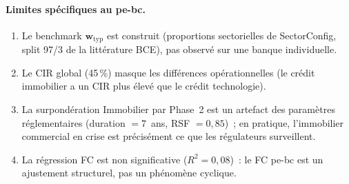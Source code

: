 \documentclass[10pt, a4paper, oneside]{report}
\theoremstyle{definition}
\begin{document}
\paragraph{Limites spécifiques au pe-bc.}
\begin{enumerate}[nosep]
  \item Le benchmark $\mathbf{w}_{\text{typ}}$ est construit (proportions sectorielles de SectorConfig, split 97/3 de la littérature BCE), pas observé sur une banque individuelle.
  \item Le CIR global (45\,\%) masque les différences opérationnelles (le crédit immobilier a un CIR plus élevé que le crédit technologie).
  \item La surpondération Immobilier par Phase~2 est un artefact des paramètres réglementaires (duration $= 7$~ans, RSF $= 0{,}85$)~; en pratique, l'immobilier commercial en crise est précisément ce que les régulateurs surveillent.
  \item La régression FC est non significative ($R^2 = 0{,}08$)~: le FC pe-bc est un ajustement structurel, pas un phénomène cyclique.
\end{enumerate}




\end{document}
